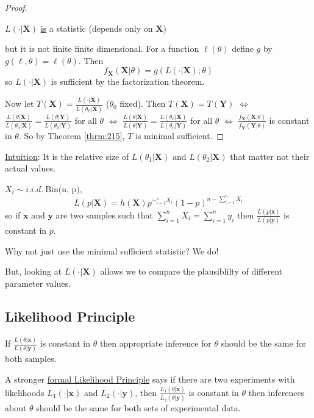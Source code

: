 \documentclass[english, 11pt]{article}
\begin{document}
\begin{proof}
\begin{note}
$L(\cdot|\bm{X})$ \underline{is} a statistic (depends only on $\bm{X}$)
\end{note}
but it is not finite finite dimensional. For a function $\ell(\theta)$ define $g$ by $g(\ell, \theta)=\ell(\theta)$. Then 
$$
f_{\bm{X}}(\bm{X}|\theta)=g(L(\cdot|\bm{X});\theta)
$$
so $L(\cdot|\bm{X})$ is sufficient by the factorization theorem.

Now let $T(\bm{X})=\frac{L(\cdot|\bm{X})}{L(\theta_0|\bm{X})}$ ($\theta_0$ fixed). Then $T(\bm{X})=T(\bm{Y})$ $\Leftrightarrow$ $\frac{L(\theta|\bm{X})}{L(\theta_0|\bm{X})}=\frac{L(\theta|\bm{Y})}{L(\theta_0|\bm{Y})}$ for all $\theta$ $\Leftrightarrow$ $\frac{L(\theta|\bm{X})}{L(\theta|\bm{Y})}=\frac{L(\theta_0|\bm{X})}{L(\theta_0|\bm{Y})}$ for all $\theta$ $\Leftrightarrow$ $\frac{f_{\bm{X}}(\bm{X}|\theta)}{f_{\bm{Y}}(\bm{Y}|\theta)}$ is constant in $\theta$.
So by Theorem \ref{thrm:215}, $T$ is minimal sufficient.
\end{proof}

\underline{Intuition}: It is the relative size of $L(\theta_1|\bm{X})$ and $L(\theta_2|\bm{X})$ that matter not their actual values.

\begin{exmp}
$X_i\sim i.i.d.~\text{Bin(n, p)}$, 
$$
L(p|\bm{X})=h(\bm{X})p^{\sim_{i=1}^nX_i}(1-p)^{n-\sum_{i=1}^nX_i}
$$
so if $\bm{x}$ and $\bm{y}$ are two samples such that $\sum_{i=1}^nX_i=\sum_{i=1}^ny_i$ then $\frac{L(p|\bm{x})}{L(p|\bm{y})}$ is constant in $p$.

Why not just use the minimal sufficient statistic? We do!

But, looking at $L(\cdot|\bm{X})$ allows we to compare the plausiblilty of different parameter values.
\end{exmp}

\subsection{Likelihood Principle}

If $\frac{L(\theta|\bm{x})}{L(\theta|\bm{y})}$ is constant in $\theta$ then appropriate inference for $\theta$ should be the same for both samples.


A stronger \underline{formal Likelihood Principle} says if there are two experiments with likelihoods $L_1(\cdot|\bm{x})$ and $L_2(\cdot|\bm{y})$, then $\frac{L_1(\theta|\bm{x})}{L_2(\theta|\bm{y})}$ is constant in $\theta$ then inferences about $\theta$ should be the same for both sets of experimental data.
\end{document}
